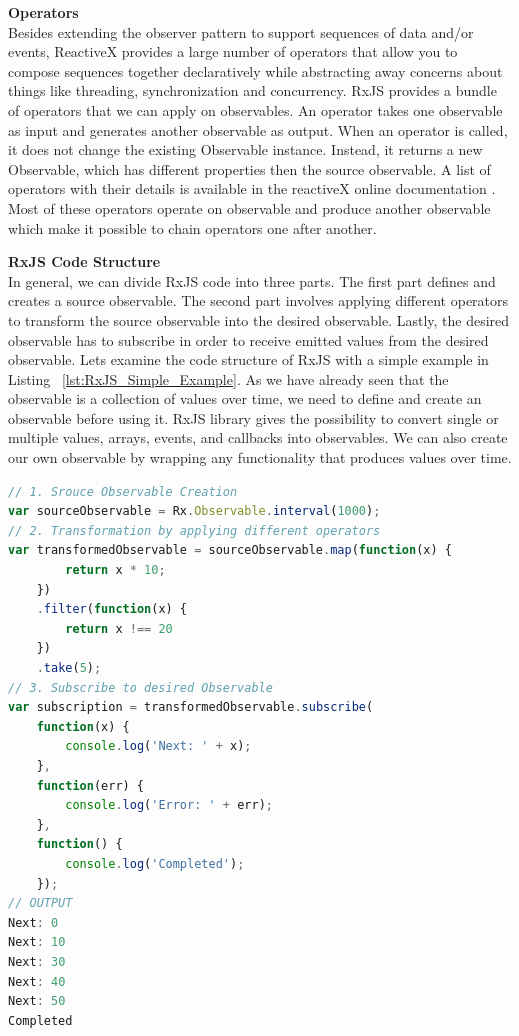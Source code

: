 \textbf{Operators}
\label{subsec:Operators}\\
Besides extending the observer pattern to support sequences of data and/or events, ReactiveX provides a large number of operators that allow you to compose sequences together declaratively while abstracting away concerns about things like threading, synchronization and concurrency. RxJS provides a bundle of operators that we can apply on observables. An operator takes one observable as input and generates another observable as output. When an operator is called, it does not change the existing Observable instance. Instead, it returns a new Observable, which has different properties then the source observable. A list of operators with their details is available in the reactiveX online documentation \cite{reactivexOperators}. Most of these operators operate on observable and produce another observable which make it possible to chain operators one after another.

\textbf{RxJS Code Structure}\\
In general, we can divide RxJS code into three parts. The first part defines and creates a source observable. The second part involves applying different operators to transform the source observable into the desired observable. Lastly, the desired observable has to subscribe in order to receive emitted values from the desired observable. Let\textquotesingle s examine the code structure of RxJS with a simple example in Listing ~\ref{lst:RxJS_Simple_Example}. As we have already seen that the observable is a collection of values over time, we need to define and create an observable before using it. RxJS library gives the possibility to convert single or multiple values, arrays, events, and callbacks into observables. We can also create our own observable by wrapping any functionality that produces values over time.
\begin{lstlisting}[language=JavaScript, caption=RxJS Simple Example, label={lst:RxJS_Simple_Example}]
// 1. Srouce Observable Creation
var sourceObservable = Rx.Observable.interval(1000);
// 2. Transformation by applying different operators
var transformedObservable = sourceObservable.map(function(x) {
		return x * 10;
	})
	.filter(function(x) {
		return x !== 20
	})
	.take(5);
// 3. Subscribe to desired Observable 
var subscription = transformedObservable.subscribe(
	function(x) {
		console.log('Next: ' + x);
	},
	function(err) {
		console.log('Error: ' + err);
	},
	function() {
		console.log('Completed');
	});
// OUTPUT
Next: 0
Next: 10
Next: 30
Next: 40
Next: 50
Completed
\end{lstlisting}

